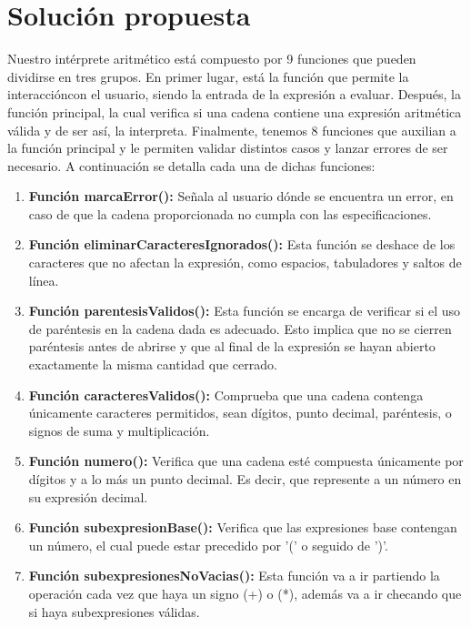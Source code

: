 \documentclass{article}
\begin{document}
\section{Solución propuesta}
\normalsize Nuestro intérprete aritmético está compuesto por 9 funciones que pueden dividirse en tres grupos. En primer lugar, está la función que permite la interaccióncon el usuario, siendo la entrada de la expresión a evaluar. Después,  la función principal,  la cual  verifica si una cadena contiene una expresión aritmética válida y de ser así, la interpreta. Finalmente, tenemos 8 funciones que auxilian a la función principal y le permiten validar distintos casos y lanzar errores de ser necesario. A continuación se detalla   cada una de dichas funciones:
\begin{enumerate}
    \item \textbf{Función marcaError():} Señala  al usuario  dónde se encuentra un error, en caso de que la cadena proporcionada  no cumpla con las especificaciones.
    
    \item \textbf{Función eliminarCaracteresIgnorados():} Esta función se deshace  de los caracteres que no afectan la expresión, como espacios, tabuladores y saltos de línea. 
    
    \item \textbf{Función parentesisValidos():} Esta función se encarga de verificar si el uso de paréntesis en la cadena dada es adecuado. Esto implica que no se cierren paréntesis antes de abrirse y que al final de la expresión se hayan abierto exactamente la misma cantidad que cerrado.
    
    \item \textbf{Función caracteresValidos():} Comprueba que una cadena contenga únicamente caracteres permitidos, sean dígitos, punto decimal, paréntesis, o signos de suma y multiplicación.
    
    \item \textbf{Función numero():} Verifica que una cadena esté compuesta únicamente por dígitos y a lo más un punto decimal. Es decir, que represente a un número en su expresión decimal.
    
    \item \textbf{Función subexpresionBase():} Verifica que las expresiones base contengan un número, el cual puede estar precedido por '(' o seguido de ')'.
    
    \item \textbf{Función subexpresionesNoVacias():} Esta función va a ir partiendo la operación cada vez que haya un signo (+) o (*), además va a ir checando que si haya subexpresiones válidas.
    

\end{enumerate}
\end{document}
